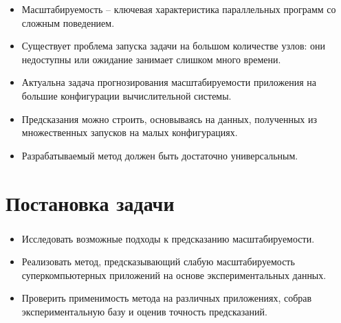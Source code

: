 \documentclass[unicode, t, 11pt]{beamer}%
\begin{document}
\begin{frame}
\begin{itemize}[label = \(\bullet\)]
			\item Масштабируемость – ключевая характеристика параллельных программ со сложным поведением.
			\item Существует проблема запуска задачи на большом количестве узлов: они недоступны или ожидание занимает слишком много времени.
			\item Актуальна задача прогнозирования масштабируемости приложения на большие конфигурации вычислительной системы.
			\item Предсказания можно строить, основываясь на данных, полученных из множественных запусков на малых конфигурациях.
			\item Разрабатываемый метод должен быть достаточно универсальным.
			
		\end{itemize}
		\end{frame}

	\section{Постановка задачи}
		\begin{frame}
			\frametitle{\insertsection}
			\begin{itemize}[label=\(\bullet\)]
				\item Исследовать возможные подходы к предсказанию масштабируемости.
				\item Реализовать метод, предсказывающий слабую масштабируемость суперкомпьютерных приложений на основе экспериментальных данных.
				\item Проверить применимость метода на различных приложениях, собрав экспериментальную базу и оценив точность предсказаний.
			\end{itemize}
		\end{frame}
\end{document}
